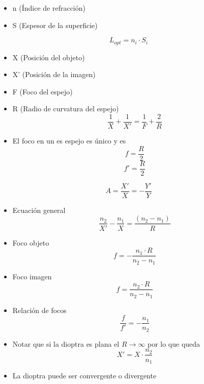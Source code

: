 \begin{itemize}
    \item n (Índice de refracción)
    \item S (Espesor de la superficie)
\end{itemize}
\begin{equation}
    L_{opt} = n_i \cdot S_i
\end{equation}

\begin{itemize}
    \item X (Posición del objeto)
    \item X' (Posición de la imagen)
    \item F (Foco del espejo)
    \item R (Radio de curvatura del espejo)
    \begin{equation}
        \frac{1}{X} + \frac{1}{X'} = \frac{1}{F} + \frac{2}{R} 
    \end{equation}
    \item El foco en un es espejo es único y es
    \begin{equation*}
        f = \frac{R}{2}
    \end{equation*}
    \begin{equation*}
        f' = \frac{R}{2}
    \end{equation*}
\end{itemize}

\begin{equation}
    A = \frac{X'}{X} = -\frac{Y'}{Y}
\end{equation}

\begin{itemize}
    \item Ecuación general
    \begin{equation}
        \frac{n_2}{X'} - \frac{n_1}{X} = \frac{(n_2 - n_1)}{R}
    \end{equation}
    \item Foco objeto
    \begin{equation}
        f = -\frac{n_1 \cdot R}{n_2 - n_1}
    \end{equation}
    \item Foco imagen
    \begin{equation}
        f = \frac{n_2 \cdot R}{n_2 - n_1}
    \end{equation}
    \item Relación de focos
    \begin{equation}
        \frac{f}{f'} = -\frac{n_1}{n_2}
    \end{equation}
    \item Notar que si la dioptra es plana el $R\rightarrow \infty$ por lo que queda
    \begin{equation*}
        X' = X \cdot \frac{n_2}{n_1}
    \end{equation*}
    \item La dioptra puede ser convergente o divergente
\end{itemize}

